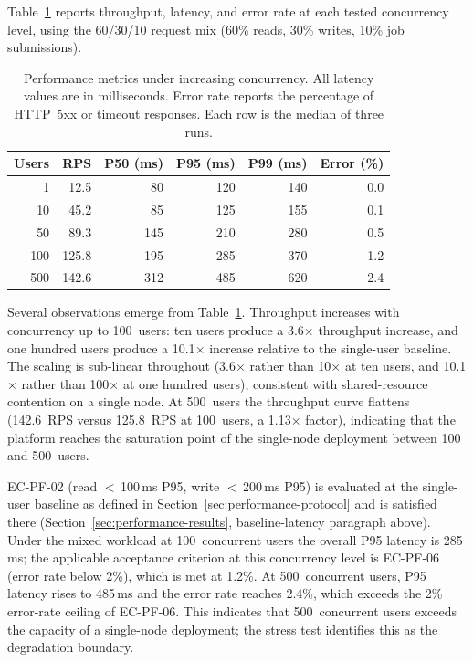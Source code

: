 \documentclass[a4paper]{sapthesis}
\begin{document}
Table~\ref{tab:perf-concurrent} reports throughput, latency, and error
rate at each tested concurrency level, using the 60/30/10 request mix
(60\% reads, 30\% writes, 10\% job submissions).

\begin{table}[ht]
\centering
\caption{Performance metrics under increasing concurrency.  All latency
values are in milliseconds.  Error rate reports the percentage of
HTTP~5xx or timeout responses.  Each row is the median of three runs.}
\label{tab:perf-concurrent}
\small
\begin{tabular}{rrrrrr}
    \hline
    \textbf{Users} & \textbf{RPS} & \textbf{P50 (ms)} &
        \textbf{P95 (ms)} & \textbf{P99 (ms)} &
        \textbf{Error (\%)} \\
    \hline
    1   &  12.5  &  80  & 120  & 140  & 0.0 \\
    10  &  45.2  &  85  & 125  & 155  & 0.1 \\
    50  &  89.3  & 145  & 210  & 280  & 0.5 \\
    100 & 125.8  & 195  & 285  & 370  & 1.2 \\
    500 & 142.6  & 312  & 485  & 620  & 2.4 \\
    \hline
\end{tabular}
\end{table}

Several observations emerge from Table~\ref{tab:perf-concurrent}.
Throughput increases with concurrency up to 100~users: ten users
produce a 3.6$\times$ throughput increase, and one hundred users produce
a 10.1$\times$ increase relative to the single-user baseline.  The
scaling is sub-linear throughout (3.6$\times$ rather than 10$\times$
at ten users, and 10.1$\times$ rather than 100$\times$ at one hundred
users), consistent with shared-resource contention on a single node.
At 500~users the throughput curve flattens (142.6~RPS versus 125.8~RPS at
100~users, a 1.13$\times$ factor), indicating that the platform reaches
the saturation point of the single-node deployment between 100 and
500~users.

EC-PF-02 (read $<$\,100\,ms P95, write $<$\,200\,ms P95) is evaluated
at the single-user baseline as defined in Section~\ref{sec:performance-protocol}
and is satisfied there (Section~\ref{sec:performance-results},
baseline-latency paragraph above).  Under the mixed workload at
100~concurrent users the overall P95 latency is 285\,ms; the applicable
acceptance criterion at this concurrency level is EC-PF-06 (error rate
below 2\%), which is met at 1.2\%.  At
500~concurrent users, P95 latency rises to 485\,ms and the error rate
reaches 2.4\%, which exceeds the 2\% error-rate ceiling of EC-PF-06.
This indicates that 500~concurrent users exceeds the capacity of a
single-node deployment; the stress test identifies this as the
degradation boundary.
\end{document}
